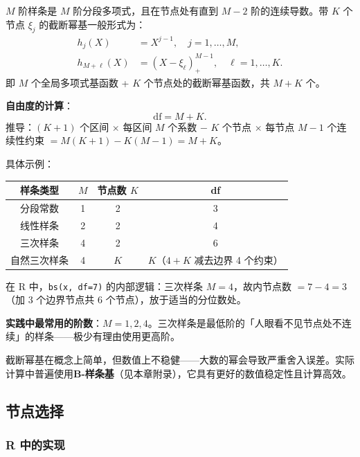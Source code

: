 $M$ 阶样条是 $M$ 阶分段多项式，且在节点处有直到 $M-2$ 阶的连续导数。带 $K$ 个节点 $\xi_j$ 的截断幂基一般形式为：
\begin{equation}\label{eq:truncated_power}
    \begin{aligned}
    h_j(X) &= X^{j-1}, \quad j = 1,\ldots,M, \\
    h_{M+\ell}(X) &= (X - \xi_\ell)_+^{M-1}, \quad \ell = 1,\ldots,K.
    \end{aligned}
\end{equation}
即 $M$ 个全局多项式基函数 + $K$ 个节点处的截断幂基函数，共 $M+K$ 个。

\textbf{自由度的计算}：
\[
\boxed{\mathrm{df} = M + K.}
\]
推导：$(K+1)$ 个区间 $\times$ 每区间 $M$ 个系数 $-$ $K$ 个节点 $\times$ 每节点 $M-1$ 个连续性约束 $= M(K+1) - K(M-1) = M+K$。

具体示例：
\begin{center}
\begin{tabular}{c|c|c|c}
\toprule
样条类型 & $M$ & 节点数 $K$ & df \\
\midrule
分段常数 & 1 & 2 & 3 \\
线性样条 & 2 & 2 & 4 \\
三次样条 & 4 & 2 & 6 \\
自然三次样条 & 4 & $K$ & $K$（$4+K$ 减去边界 4 个约束） \\
\bottomrule
\end{tabular}
\end{center}

在 R 中，\texttt{bs(x, df=7)} 的内部逻辑：三次样条 $M=4$，故内节点数 $= 7-4 = 3$（加 3 个边界节点共 6 个节点），放于适当的分位数处。

\textbf{实践中最常用的阶数}：$M=1,2,4$。三次样条是最低阶的「人眼看不见节点处不连续」的样条——极少有理由使用更高阶。

\begin{remark}
截断幂基在概念上简单，但数值上不稳健——大数的幂会导致严重舍入误差。实际计算中普遍使用\textbf{B-样条基}（见本章附录），它具有更好的数值稳定性且计算高效。
\end{remark}

\subsection{节点选择}

\subsubsection{R 中的实现}

